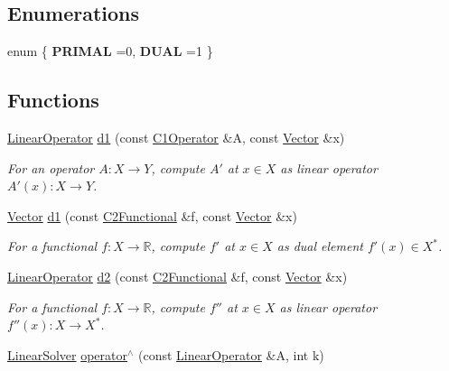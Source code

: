 \subsection*{Enumerations}
\begin{DoxyCompactItemize}
\item 
enum \{ {\bfseries P\+R\+I\+M\+AL} =0, 
{\bfseries D\+U\+AL} =1
 \}\hypertarget{group__ProductSpaceGroup_gaf65a00de69cbc808db7cddb728796894}{}\label{group__ProductSpaceGroup_gaf65a00de69cbc808db7cddb728796894}

\end{DoxyCompactItemize}
\subsection*{Functions}
\begin{DoxyCompactItemize}
\item 
\hyperlink{classSpacy_1_1LinearOperator}{Linear\+Operator} \hyperlink{namespaceSpacy_a2205e2a2c4bb5242665bbc09929d35d2}{d1} (const \hyperlink{classSpacy_1_1C1Operator}{C1\+Operator} \&A, const \hyperlink{classSpacy_1_1Vector}{Vector} \&x)
\begin{DoxyCompactList}\small\item\em For an operator $ A: X\to Y $, compute $A'$ at $x\in X$ as linear operator $ A'(x): X \to Y $. \end{DoxyCompactList}\item 
\hyperlink{classSpacy_1_1Vector}{Vector} \hyperlink{namespaceSpacy_ab6646eb7068eb9f1369e639cf0b620a2}{d1} (const \hyperlink{classSpacy_1_1C2Functional}{C2\+Functional} \&f, const \hyperlink{classSpacy_1_1Vector}{Vector} \&x)
\begin{DoxyCompactList}\small\item\em For a functional $ f: X\to \mathbb{R} $, compute $f'$ at $x\in X$ as dual element $ f'(x) \in X^* $. \end{DoxyCompactList}\item 
\hyperlink{classSpacy_1_1LinearOperator}{Linear\+Operator} \hyperlink{namespaceSpacy_a569d8fc0b4a0e292f257dd6307a25c8f}{d2} (const \hyperlink{classSpacy_1_1C2Functional}{C2\+Functional} \&f, const \hyperlink{classSpacy_1_1Vector}{Vector} \&x)
\begin{DoxyCompactList}\small\item\em For a functional $ f: X\to \mathbb{R} $, compute $f''$ at $x\in X$ as linear operator $ f''(x): X \to X^* $. \end{DoxyCompactList}\item 
\hyperlink{namespaceSpacy_adcd0d78166a9c972b8a2e5a689fc2d03}{Linear\+Solver} \hyperlink{namespaceSpacy_ab1be097dacbf27785979de79ed5b3178}{operator$^\wedge$} (const \hyperlink{classSpacy_1_1LinearOperator}{Linear\+Operator} \&A, int k)\hypertarget{namespaceSpacy_ab1be097dacbf27785979de79ed5b3178}{}\label{namespaceSpacy_ab1be097dacbf27785979de79ed5b3178}


\end{DoxyCompactItemize}
